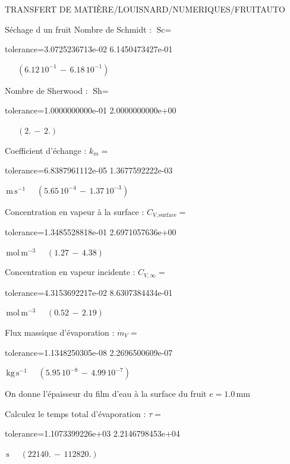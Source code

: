\documentclass[12pt]{article}
\begin{document}
\begin{quiz}{TRANSFERT DE MATIÈRE/LOUISNARD/NUMERIQUES/FRUITAUTO}
\begin{cloze}{Séchage d un fruit}
Nombre de Schmidt : $\text{Sc} =  $
\begin{numerical}[points=1] 
\item[tolerance={3.0725236713e-02}] 6.1450473427e-01 
\end{numerical} 
 $\,$ 
 $ \quad ( 6.12 \, 10^{-1}  \, - \,  6.18 \, 10^{-1} ) $ 

Nombre de Sherwood : $\text{Sh} =  $
\begin{numerical}[points=2] 
\item[tolerance={1.0000000000e-01}] 2.0000000000e+00 
\end{numerical} 
 $\,$ 
 $ \quad (2. \, - \, 2.) $ 

Coefficient d'échange : $k_m =  $
\begin{numerical}[points=1] 
\item[tolerance={6.8387961112e-05}] 1.3677592222e-03 
\end{numerical} 
 $\,  \mathrm{m}\,  \mathrm{s}^{-1}$ 
 $ \quad ( 5.65 \, 10^{-4}  \, - \,  1.37 \, 10^{-3} ) $ 

Concentration en vapeur à la surface : $C_{V, \text{surface}} =  $
\begin{numerical}[points=2] 
\item[tolerance={1.3485528818e-01}] 2.6971057636e+00 
\end{numerical} 
 $\,  \mathrm{mol}\,  \mathrm{m}^{-3}$ 
 $ \quad (1.27 \, - \, 4.38) $ 

Concentration en vapeur incidente : $C_{V, \infty} =  $
\begin{numerical}[points=2] 
\item[tolerance={4.3153692217e-02}] 8.6307384434e-01 
\end{numerical} 
 $\,  \mathrm{mol}\,  \mathrm{m}^{-3}$ 
 $ \quad (0.52 \, - \, 2.19) $ 

Flux massique d'évaporation : $\dot{m}_V =  $
\begin{numerical}[points=1] 
\item[tolerance={1.1348250305e-08}] 2.2696500609e-07 
\end{numerical} 
 $\,  \mathrm{kg}\,  \mathrm{s}^{-1}$ 
 $ \quad ( 5.95 \, 10^{-8}  \, - \,  4.99 \, 10^{-7} ) $ 

 

On donne l'épaisseur du film d'eau à la surface du fruit $e = 1.0\,  \mathrm{mm} $

Calculez le temps total d'évaporation : $\tau =  $
\begin{numerical}[points=2] 
\item[tolerance={1.1073399226e+03}] 2.2146798453e+04 
\end{numerical} 
 $\,  \mathrm{s}$ 
 $ \quad (22140. \, - \, 112820.) $ 


\end{cloze}
\end{quiz}
\end{document}
